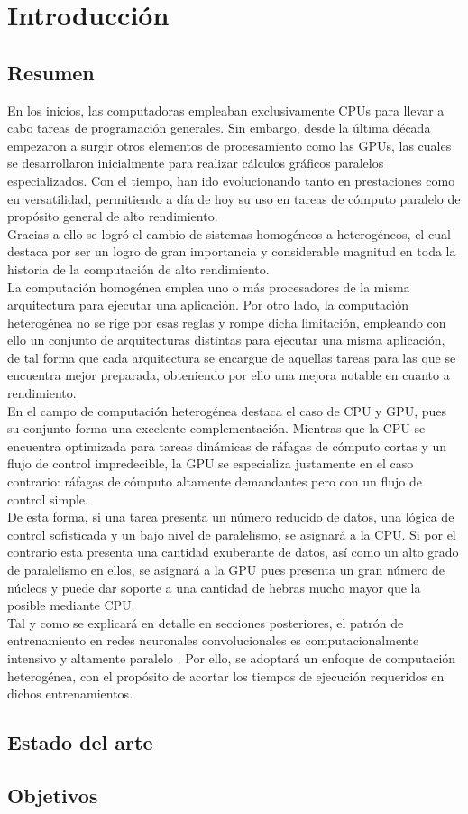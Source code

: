 \chapter{Introducción}

\section{Resumen}
En los inicios, las computadoras empleaban exclusivamente CPUs para llevar a cabo tareas de programación generales. Sin embargo, desde la última década empezaron a surgir otros elementos de procesamiento como las GPUs, las cuales se desarrollaron inicialmente para realizar cálculos gráficos paralelos especializados. Con el tiempo, han ido evolucionando tanto en prestaciones como en versatilidad, permitiendo a día de hoy su uso en tareas de cómputo paralelo de propósito general de alto rendimiento. \\
Gracias a ello se logró el cambio de sistemas homogéneos a heterogéneos, el cual destaca por ser un logro de gran importancia y considerable magnitud en toda la historia de la computación de alto rendimiento. \\
La computación homogénea emplea uno o más procesadores de la misma arquitectura para ejecutar una aplicación. Por otro lado, la computación heterogénea no se rige por esas reglas y rompe dicha limitación, empleando con ello un conjunto de arquitecturas distintas para ejecutar una misma aplicación, de tal forma que cada arquitectura se encargue de aquellas tareas para las que se encuentra mejor preparada, obteniendo por ello una mejora notable en cuanto a rendimiento. \\
En el campo de computación heterogénea destaca el caso de CPU y GPU, pues su conjunto forma una excelente complementación. Mientras que la CPU se encuentra optimizada para tareas dinámicas de ráfagas de cómputo cortas y un flujo de control impredecible, la GPU se especializa justamente en el caso contrario: ráfagas de cómputo altamente demandantes pero con un flujo de control simple. \\
De esta forma, si una tarea presenta un número reducido de datos, una lógica de control sofisticada y un bajo nivel de paralelismo, se asignará a la CPU. Si por el contrario esta presenta una cantidad exuberante de datos, así como un alto grado de paralelismo en ellos, se asignará a la GPU pues presenta un gran número de núcleos y puede dar soporte a una cantidad de hebras mucho mayor que la posible mediante CPU. \cite{Professional_CUDA_C} \\
Tal y como se explicará en detalle en secciones posteriores, el patrón de entrenamiento en redes neuronales convolucionales es computacionalmente intensivo y altamente paralelo \cite{Programming_Massively}. Por ello, se adoptará un enfoque de computación heterogénea, con el propósito de acortar los tiempos de ejecución requeridos en dichos entrenamientos.


\section{Estado del arte}
\section{Objetivos}